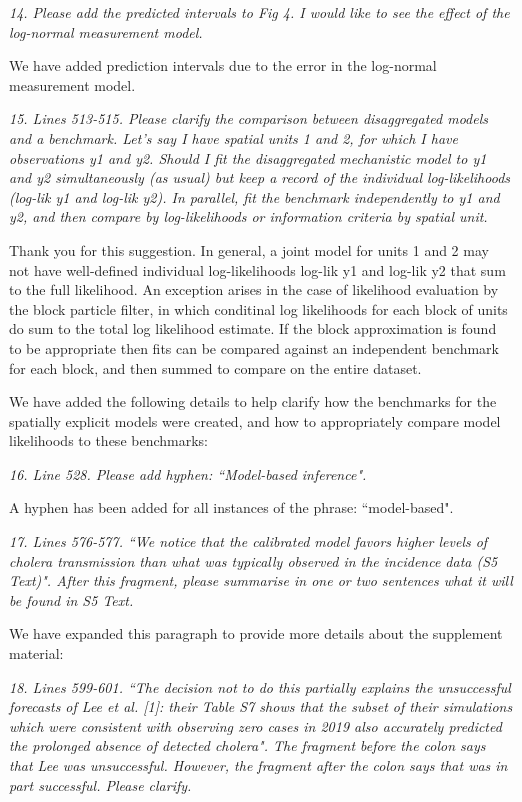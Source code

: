 \documentclass[11pt]{article}
\newcommand\report[1]{{\color{mygreen} \vspace{1mm}\hspace{0.25in}\parbox{6in}{\em #1}}}
\newcommand\article[1]{{\color{blue} \vspace{1mm}\hspace{0.25in}\parbox{6in}{\em #1}}}
\begin{document}
\report{
  14. Please add the predicted intervals to Fig 4. I would like to see the effect of the log-normal measurement model.
}

We have added prediction intervals due to the error in the log-normal measurement model.

\report{
  15. Lines 513-515. Please clarify the comparison between disaggregated models and a benchmark. Let’s say I have spatial units 1 and 2, for which I have observations y1 and y2. Should I fit the disaggregated mechanistic model to y1 and y2 simultaneously (as usual) but keep a record of the individual log-likelihoods (log-lik y1 and log-lik y2). In parallel, fit the benchmark independently to y1 and y2, and then compare by log-likelihoods or information criteria by spatial unit.
}

Thank you for this suggestion.
In general, a joint model for units 1 and 2 may not have well-defined individual log-likelihoods log-lik y1 and log-lik y2 that sum to the full likelihood.
An exception arises in the case of likelihood evaluation by the block particle filter, in which conditinal log likelihoods for each block of units do sum to the total log likelihood estimate.
If the block approximation is found to be appropriate \cite{ionides21,ionides22} then fits can be compared against an independent benchmark for each block, and then summed to compare on the entire dataset.

We have added the following details to help clarify how the benchmarks for the spatially explicit models were created, and how to appropriately compare model likelihoods to these benchmarks:

\article{\editSpatBench}


\report{
  16. Line 528. Please add hyphen: ``Model-based inference".
}

A hyphen has been added for all instances of the phrase: ``model-based".

\report{
  17. Lines 576-577. ``We notice that the calibrated model favors higher levels of cholera transmission than what was typically observed in the incidence data (S5 Text)". After this fragment, please summarise in one or two sentences what it will be found in S5 Text.
}

We have expanded this paragraph to provide more details about the supplement material: 

\article{\editSuppText}

\report{
  18. Lines 599-601. ``The decision not to do this partially explains the unsuccessful forecasts of Lee et al. [1]: their Table S7 shows that the subset of their simulations which were consistent with observing zero cases in 2019 also accurately predicted the prolonged absence of detected cholera". The fragment before the colon says that Lee was unsuccessful. However, the fragment after the colon says that was in part successful. Please clarify.
}
\end{document}
